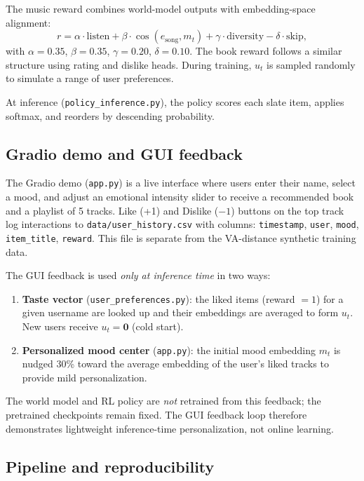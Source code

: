\documentclass[11pt]{article}
\begin{document}
The music reward combines world-model outputs with embedding-space
alignment:
\[
r = \alpha \cdot \text{listen}
  + \beta \cdot \cos(e_{\text{song}}, m_t)
  + \gamma \cdot \text{diversity}
  - \delta \cdot \text{skip},
\]
with $\alpha{=}0.35$, $\beta{=}0.35$, $\gamma{=}0.20$,
$\delta{=}0.10$. The book reward follows a similar structure using rating
and dislike heads. During training, $u_t$ is sampled randomly to
simulate a range of user preferences.

At inference (\texttt{policy\_inference.py}), the policy scores each
slate item, applies softmax, and reorders by descending probability.

\subsection{Gradio demo and GUI feedback}
\label{sec:method-gui}

The Gradio demo (\texttt{app.py}) is a live interface where users enter
their name, select a mood, and adjust an emotional intensity slider to
receive a recommended book and a playlist of 5 tracks. Like (+1) and
Dislike ($-1$) buttons on the top track log interactions to
\texttt{data/user\_history.csv} with columns: \texttt{timestamp},
\texttt{user}, \texttt{mood}, \texttt{item\_title}, \texttt{reward}.
This file is separate from the VA-distance synthetic training data.

The GUI feedback is used \emph{only at inference time} in two ways:
\begin{enumerate}[leftmargin=*, itemsep=1pt]
    \item \textbf{Taste vector} (\texttt{user\_preferences.py}): the
    liked items (reward $= 1$) for a given username are looked up and
    their embeddings are averaged to form $u_t$. New users receive
    $u_t = \mathbf{0}$ (cold start).
    \item \textbf{Personalized mood center} (\texttt{app.py}): the
    initial mood embedding $m_t$ is nudged 30\% toward the average
    embedding of the user's liked tracks to provide mild
    personalization.
\end{enumerate}
The world model and RL policy are \emph{not} retrained from this
feedback; the pretrained checkpoints remain fixed. The GUI feedback loop
therefore demonstrates lightweight inference-time personalization, not
online learning.

\subsection{Pipeline and reproducibility}
\label{sec:method-pipeline}
\end{document}

